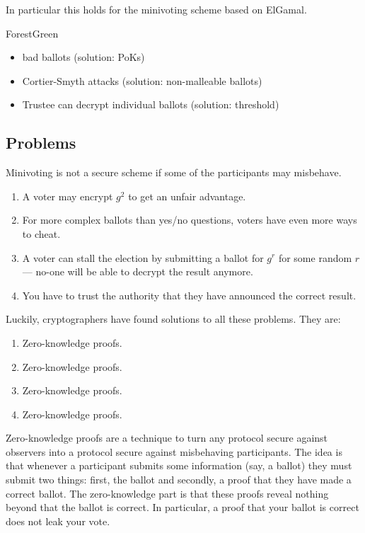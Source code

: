 \documentclass{llncs}
\newenvironment{structure}{
  \begin{color}{ForestGreen}
}{
  \end{color}
}
\begin{document}
In particular this holds for the minivoting scheme based on ElGamal.

\begin{structure}
\begin{itemize}
\item bad ballots (solution: PoKs)
\item Cortier-Smyth attacks (solution: non-malleable ballots)
\item Trustee can decrypt individual ballots (solution: threshold)
\end{itemize}
\end{structure}

\subsection{Problems}

Minivoting is not a secure scheme if some of the participants may misbehave.
\begin{enumerate}
\item A voter may encrypt $g^2$ to get an unfair advantage.
\item For more complex ballots than yes/no questions, voters have even more ways
to cheat.
\item A voter can stall the election by submitting a ballot for $g^r$ for some
random $r$ --- no-one will be able to decrypt the result anymore.
\item You have to trust the authority that they have announced the correct
result.
\end{enumerate}

Luckily, cryptographers have found solutions to all these problems. They are:
\begin{enumerate}
\item Zero-knowledge proofs.
\item Zero-knowledge proofs.
\item Zero-knowledge proofs.
\item Zero-knowledge proofs.
\end{enumerate}

Zero-knowledge proofs are a technique to turn any protocol secure against
observers into a protocol secure against misbehaving participants. The idea is
that whenever a participant submits some information (say, a ballot) they must
submit two things: first, the ballot and secondly, a proof that they have made a
correct ballot. The zero-knowledge part is that these proofs reveal nothing
beyond that the ballot is correct. In particular, a proof that your ballot is
correct does not leak your vote.
\end{document}
